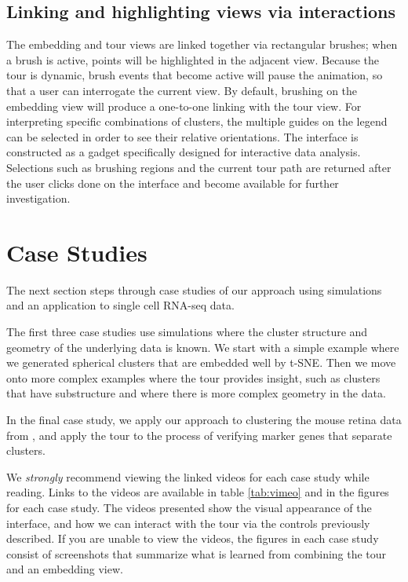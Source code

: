 \documentclass[article,notitle]{jdssv}
\begin{document}
\hypertarget{linking-and-highlighting-views-via-interactions}{%
\subsection{Linking and highlighting views via interactions}\label{linking-and-highlighting-views-via-interactions}}

The embedding and tour views are linked together via rectangular brushes;
when a brush is active, points will be highlighted in the adjacent view.
Because the tour is dynamic, brush events that become active will pause the
animation, so that a user can interrogate the current view. By default,
brushing on the embedding view will produce a one-to-one linking with the tour
view. For interpreting specific combinations of clusters, the multiple
guides on the legend can be selected in order to see their relative orientations.
The interface is constructed as a  gadget specifically designed for
interactive data analysis. Selections such as brushing regions and the current
tour path are returned after the user clicks done on the interface and become
available for further investigation.

\hypertarget{case-studies}{%
\section{Case Studies}\label{case-studies}}

The next section steps through case studies of our approach using simulations
and an application to single cell RNA-seq data.

The first three case studies use simulations where the cluster structure and
geometry of the underlying data is known. We start with a simple example
where we generated spherical clusters that are embedded well by t-SNE. Then
we move onto more complex examples where the tour provides insight, such
as clusters that have substructure and where there is more complex geometry
in the data.

In the final case study, we apply our approach to clustering
the mouse retina data from \citet{Macosko2015-ot}, and apply the tour
to the process of verifying marker genes that separate clusters.

We \emph{strongly} recommend viewing the linked videos for each case study
while reading. Links to the videos are available in table \ref{tab:vimeo}
and in the figures for each case study. The videos presented show the visual
appearance of the  interface, and how we can interact with the tour
via the controls previously described. If you are unable to view the videos,
the figures in each case study consist of screenshots that summarize what is
learned from combining the tour and an embedding view.
\end{document}
